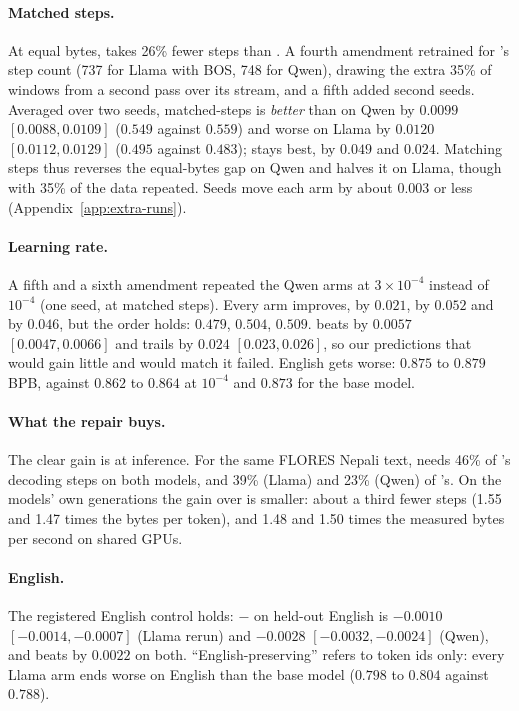 \paragraph{Matched steps.} At equal bytes, \RII{} takes 26\% fewer steps than \RI{}. A fourth amendment retrained \RII{} for \RI{}'s step count (737 for Llama with BOS, 748 for Qwen), drawing the extra 35\% of windows from a second pass over its stream, and a fifth added second seeds. Averaged over two seeds, matched-steps \RII{} is \emph{better} than \RI{} on Qwen by $0.0099$ $[0.0088, 0.0109]$ ($0.549$ against $0.559$) and worse on Llama by $0.0120$ $[0.0112, 0.0129]$ ($0.495$ against $0.483$); \RO{} stays best, by $0.049$ and $0.024$. Matching steps thus reverses the equal-bytes gap on Qwen and halves it on Llama, though with 35\% of the data repeated. Seeds move each arm by about $0.003$ or less (Appendix~\ref{app:extra-runs}).

\paragraph{Learning rate.} A fifth and a sixth amendment repeated the Qwen arms at $3{\times}10^{-4}$ instead of $10^{-4}$ (one seed, \RII{} at matched steps). Every arm improves, \RO{} by $0.021$, \RI{} by $0.052$ and \RII{} by $0.046$, but the order holds: \RO{} $0.479$, \RII{} $0.504$, \RI{} $0.509$. \RII{} beats \RI{} by $0.0057$ $[0.0047, 0.0066]$ and trails \RO{} by $0.024$ $[0.023, 0.026]$, so our predictions that \RO{} would gain little and \RII{} would match it failed. English gets worse: $0.875$ to $0.879$ BPB, against $0.862$ to $0.864$ at $10^{-4}$ and $0.873$ for the base model.

\paragraph{What the repair buys.} The clear gain is at inference. For the same FLORES Nepali text, \RII{} needs 46\% of \RI{}'s decoding steps on both models, and 39\% (Llama) and 23\% (Qwen) of \RO{}'s. On the models' own generations the gain over \RI{} is smaller: about a third fewer steps (1.55 and 1.47 times the bytes per token), and 1.48 and 1.50 times the measured bytes per second on shared GPUs.

\paragraph{English.} The registered English control holds: \RII{} $-$ \RO{} on held-out English is $-0.0010$ $[-0.0014, -0.0007]$ (Llama rerun) and $-0.0028$ $[-0.0032, -0.0024]$ (Qwen), and \RII{} beats \RI{} by $0.0022$ on both. ``English-preserving'' refers to token ids only: every Llama arm ends worse on English than the base model ($0.798$ to $0.804$ against $0.788$).
